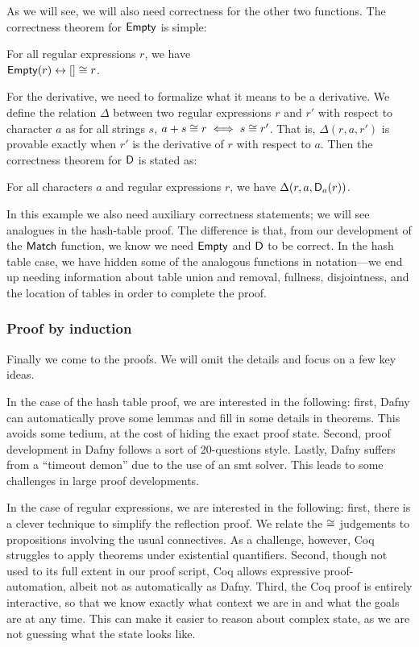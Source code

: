 As we will see, we will also need correctness for the other two functions. The
correctness theorem for \(\mathsf{Empty}\) is simple:
\begin{lem}\label{Lem:r_empty}
    For all regular expressions \(r\), we have \\
    \(\mathsf{Empty}(r) \mathrel{\leftrightarrow} [] \mathrel{\cong} r\).
\end{lem}

For the derivative, we need to formalize what it means to be a derivative. We
define the relation \(\Delta\) between two regular expressions \(r\) and \(r'\)
with respect to character \(a\) as for all strings \(s\), \(a+s \mathrel{\cong} r \iff
s \mathrel{\cong} r'\). That is, \(\Delta(r, a, r')\) is provable exactly when \(r'\)
is the derivative of \(r\) with respect to \(a\). Then the correctness theorem
for \(\mathsf{D}\) is stated as:
\begin{lem}\label{Lem:r_derive}
    For all characters \(a\) and regular expressions \(r\), we have
    \(\Delta(r, a, \mathsf{D}_a(r))\).
\end{lem}

In this example we also need auxiliary correctness statements; we will see
analogues in the hash-table proof. The difference is that, from our development
of the \(\mathsf{Match}\) function, we know we need \(\mathsf{Empty}\) and
\(\mathsf{D}\) to be correct. In the hash table case, we have hidden some of the
analogous functions in notation---we end up needing information about table
union and removal, fullness, disjointness, and the location of tables in order
to complete the proof.

\subsubsection{Proof by induction}\label{S:ex_ind}

Finally we come to the proofs. We will omit the details and focus on a few key
ideas.

In the case of the hash table proof, we are interested in the following: first,
Dafny can automatically prove some lemmas and fill in some details in theorems.
This avoids some tedium, at the cost of hiding the exact proof state. Second,
proof development in Dafny follows a sort of 20-questions style. Lastly, Dafny
suffers from a ``timeout demon'' due to the use of an \gls{smt} solver. This
leads to some challenges in large proof developments.

In the case of regular expressions, we are interested in the following: first,
there is a clever technique to simplify the reflection proof. We relate the
\(\mathrel{\cong}\) judgements to propositions involving the usual connectives. As a
challenge, however, Coq struggles to apply theorems under existential
quantifiers. Second, though not used to its full extent in our proof script, Coq
allows expressive proof-automation, albeit not as automatically as Dafny. Third,
the Coq proof is entirely interactive, so that we know exactly what context we
are in and what the goals are at any time. This can make it easier to reason
about complex state, as we are not guessing what the state looks like.

